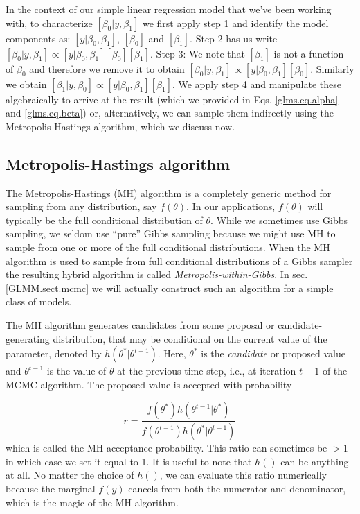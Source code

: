 In the context of our simple linear regression model that we've been 
working with, to characterize $[\beta_0|y,\beta_1]$ we first apply step 1
and identify the model components as: $[y|\beta_0, \beta_1]$, $[\beta_0]$
and $[\beta_1]$. Step 2 has us write $[\beta_0|y,\beta_1] \propto
[y|\beta_0,\beta_1][\beta_0][\beta_1]$.  Step 3: We note that $[\beta_1]$ is not a
function of $\beta_0$ and therefore we remove it to obtain $[\beta_0|y,\beta_1]
\propto [y|\beta_0,\beta_1][\beta_0]$. Similarly we obtain $[\beta_1|y,\beta_0]
\propto [y|\beta_0,\beta_1][\beta_1]$. We apply step 4 and manipulate
these algebraically to arrive at the result (which we provided in
Eqs. \ref{glms.eq.alpha} and \ref{glms.eq.beta}) or, alternatively, we can
sample them indirectly using the Metropolis-Hastings algorithm, which we 
discuss now.


\subsection{Metropolis-Hastings algorithm}

The Metropolis-Hastings (MH) algorithm is a completely generic method for
sampling from any distribution, say $f(\theta)$. In our applications,
$f(\theta)$ will typically be the full conditional distribution of
$\theta$.
While we sometimes use Gibbs sampling, we seldom
use ``pure'' Gibbs sampling because we might use MH to sample from one
or more of the full conditional distributions.
When the MH algorithm is used to sample from  full
conditional distributions of a Gibbs sampler the resulting hybrid algorithm is
called
 {\it Metropolis-within-Gibbs}.
In sec. \ref{GLMM.sect.mcmc} we will
actually construct such an algorithm for a simple class of models.

The MH algorithm generates candidates from some
proposal or candidate-generating distribution, that may be conditional
on the current value of the parameter, denoted by
$h(\theta^{*}|\theta^{t-1})$. Here, $\theta^{*}$ is the {\it candidate}
or proposed
value and $\theta^{t-1}$ is the value of $\theta$ at the previous time step, i.e., at iteration $t-1$ of
the MCMC algorithm.  The proposed value
is accepted with probability

\[
r = \frac{ f(\theta^{*}) h(\theta^{t-1}|\theta^{*})}
    {f(\theta^{t-1}) h(\theta^{*}|\theta^{t-1}) }
\]
which is called the MH acceptance probability.
This ratio can sometimes be $>1$ in which case we set it equal to
1. It is useful to note that $h()$ can be anything at all. No matter
the choice of $h()$, we can evaluate this ratio numerically because
the marginal $f(y)$ cancels from both the numerator and
denominator, which is the magic of the MH algorithm.


